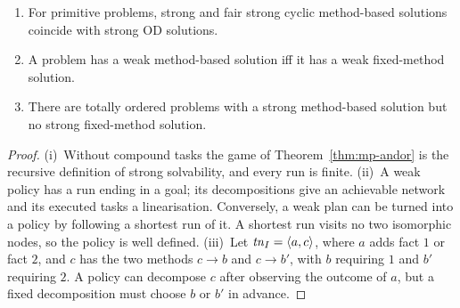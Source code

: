 \begin{proposition}\label{prop:fm-vs-mp}
  \begin{enumerate}[label=(\roman*)]
    \item For primitive problems, strong and fair strong cyclic method-based solutions coincide
      with strong OD solutions.
    \item A problem has a weak method-based solution iff it has a weak fixed-method solution.
    \item There are totally ordered problems with a strong method-based solution but no strong
      fixed-method solution.
  \end{enumerate}
\end{proposition}

\begin{proof}
  (i)~Without compound tasks the game of Theorem~\ref{thm:mp-andor} is the recursive definition of
  strong solvability, and every run is finite.
  (ii)~A weak policy has a run ending in a goal; its decompositions give an achievable network
  and its executed tasks a linearisation. Conversely, a weak plan can be turned into a policy by
  following a shortest run of it. A shortest run visits no two isomorphic nodes, so the policy is
  well defined.
  (iii)~Let $\mathit{tn}_I=\langle a,c\rangle$, where $a$ adds fact $1$ or fact $2$, and $c$ has the two
  methods $c\to b$ and $c\to b'$, with $b$ requiring $1$ and $b'$ requiring $2$. A policy can
  decompose $c$ after observing the outcome of $a$, but a fixed decomposition must choose $b$ or
  $b'$ in advance.
\end{proof}
